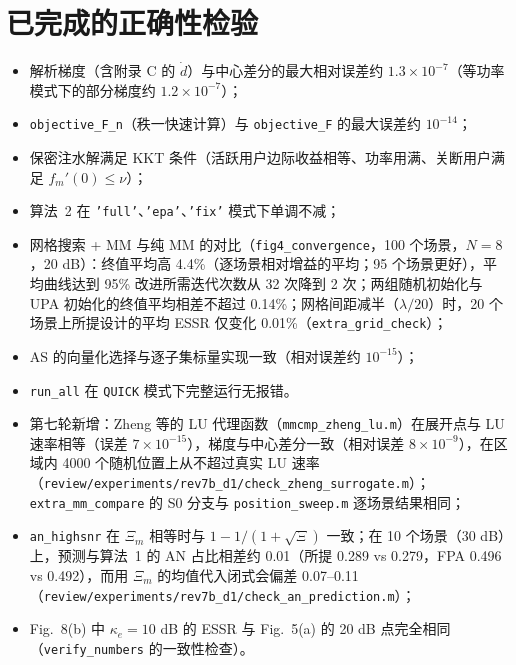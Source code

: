 \documentclass[11pt,a4paper]{ctexart}
\newcommand{\code}[1]{\texttt{#1}}
\begin{document}
\section{已完成的正确性检验}
\begin{itemize}
\item 解析梯度（含附录 C 的 $\dot d$）与中心差分的最大相对误差约 $1.3\times10^{-7}$（等功率模式下的部分梯度约 $1.2\times10^{-7}$）；
\item \code{objective\_F\_n}（秩一快速计算）与 \code{objective\_F} 的最大误差约 $10^{-14}$；
\item 保密注水解满足 KKT 条件（活跃用户边际收益相等、功率用满、关断用户满足 $f_m'(0)\le\nu$）；
\item 算法~2 在 \code{'full'}、\code{'epa'}、\code{'fix'} 模式下单调不减；
\item 网格搜索 + MM 与纯 MM 的对比（\code{fig4\_convergence}，100 个场景，$N=8$，20 dB）：终值平均高 4.4\%（逐场景相对增益的平均；95 个场景更好），平均曲线达到 95\% 改进所需迭代次数从 32 次降到 2 次；两组随机初始化与 UPA 初始化的终值平均相差不超过 0.14\%；网格间距减半（$\lambda/20$）时，20 个场景上所提设计的平均 ESSR 仅变化 0.01\%（\code{extra\_grid\_check}）；
\item AS 的向量化选择与逐子集标量实现一致（相对误差约 $10^{-15}$）；
\item \code{run\_all} 在 \code{QUICK} 模式下完整运行无报错。
\item 第七轮新增：Zheng 等的 LU 代理函数（\code{mmcmp\_zheng\_lu.m}）在展开点与 LU 速率相等（误差 $7\times10^{-15}$），梯度与中心差分一致（相对误差 $8\times10^{-9}$），在区域内 4000 个随机位置上从不超过真实 LU 速率（\code{review/experiments/rev7b\_d1/check\_zheng\_surrogate.m}）；\code{extra\_mm\_compare} 的 S0 分支与 \code{position\_sweep.m} 逐场景结果相同；
\item \code{an\_highsnr} 在 $\Xi_m$ 相等时与 $1-1/(1+\sqrt\Xi)$ 一致；在 10 个场景（30 dB）上，预测与算法~1 的 AN 占比相差约 0.01（所提 0.289 vs 0.279，FPA 0.496 vs 0.492），而用 $\Xi_m$ 的均值代入闭式会偏差 0.07--0.11（\code{review/experiments/rev7b\_d1/check\_an\_prediction.m}）；
\item Fig.~8(b) 中 $\kappa_e=10$ dB 的 ESSR 与 Fig.~5(a) 的 20 dB 点完全相同（\code{verify\_numbers} 的一致性检查）。
\end{itemize}
\end{document}
